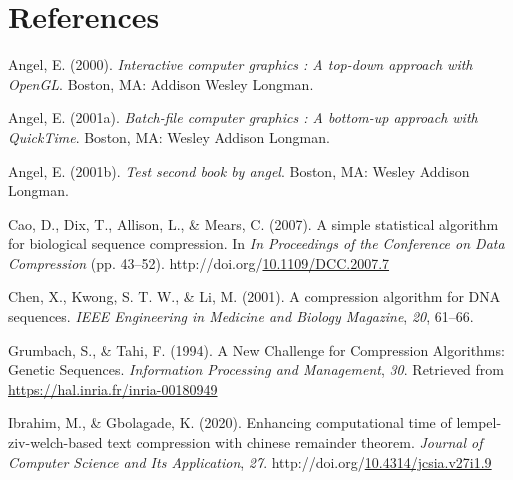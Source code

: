 \documentclass[12pt,twoside]{reedthesis}
\newlength{\cslhangindent}
\newenvironment{CSLReferences}[2] %
 {%
  \setlength{\parindent}{0pt}
  \ifodd #1 \everypar{\setlength{\hangindent}{\cslhangindent}}\ignorespaces\fi
  \ifnum #2 > 0
  \setlength{\parskip}{#2\baselineskip}
  \fi
 }%
 {}
\begin{document}
\backmatter

\hypertarget{references}{%
\chapter*{References}\label{references}}


\noindent

\setlength{\parindent}{-0.20in}

\hypertarget{refs}{}
\begin{CSLReferences}{1}{0}
\leavevmode{}%
Angel, E. (2000). \emph{Interactive computer graphics : A top-down approach with OpenGL}. Boston, MA: Addison Wesley Longman.

\leavevmode{}%
Angel, E. (2001a). \emph{Batch-file computer graphics : A bottom-up approach with QuickTime}. Boston, MA: Wesley Addison Longman.

\leavevmode{}%
Angel, E. (2001b). \emph{Test second book by angel}. Boston, MA: Wesley Addison Longman.

\leavevmode{}%
Cao, D., Dix, T., Allison, L., \& Mears, C. (2007). A simple statistical algorithm for biological sequence compression. In \emph{In Proceedings of the Conference on Data Compression} (pp. 43--52). http://doi.org/\href{https://doi.org/10.1109/DCC.2007.7}{10.1109/DCC.2007.7}

\leavevmode{}%
Chen, X., Kwong, S. T. W., \& Li, M. (2001). A compression algorithm for DNA sequences. \emph{IEEE Engineering in Medicine and Biology Magazine}, \emph{20}, 61--66.

\leavevmode{}%
Grumbach, S., \& Tahi, F. (1994). {A New Challenge for Compression Algorithms: Genetic Sequences}. \emph{{Information Processing and Management}}, \emph{30}. Retrieved from \url{https://hal.inria.fr/inria-00180949}

\leavevmode{}%
Ibrahim, M., \& Gbolagade, K. (2020). Enhancing computational time of lempel-ziv-welch-based text compression with chinese remainder theorem. \emph{Journal of Computer Science and Its Application}, \emph{27}. http://doi.org/\href{https://doi.org/10.4314/jcsia.v27i1.9}{10.4314/jcsia.v27i1.9}


\end{CSLReferences}
\end{document}
